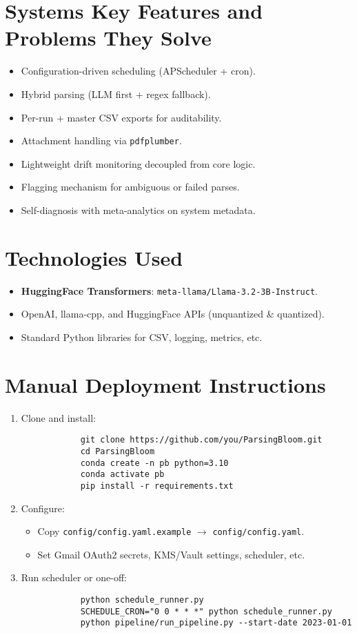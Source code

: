\documentclass{article}
\begin{document}
	\section{Systems Key Features and Problems They Solve}
	\begin{itemize}
		\item Configuration-driven scheduling (APScheduler + cron).  
		\item Hybrid parsing (LLM first + regex fallback).  
		\item Per-run + master CSV exports for auditability.  
		\item Attachment handling via \texttt{pdfplumber}.  
		\item Lightweight drift monitoring decoupled from core logic.  
		\item Flagging mechanism for ambiguous or failed parses.  
		\item Self-diagnosis with meta-analytics on system metadata.  
	\end{itemize}
	
	\section{Technologies Used}
	\begin{itemize}
		\item \textbf{HuggingFace Transformers}: \texttt{meta-llama/Llama-3.2-3B-Instruct}.  
		\item OpenAI, llama-cpp, and HuggingFace APIs (unquantized & quantized).  
		\item Standard Python libraries for CSV, logging, metrics, etc.  
	\end{itemize}
	
	\section{Manual Deployment Instructions}
	\begin{enumerate}
		\item Clone and install:
		\begin{verbatim}
			git clone https://github.com/you/ParsingBloom.git
			cd ParsingBloom
			conda create -n pb python=3.10
			conda activate pb
			pip install -r requirements.txt
		\end{verbatim}
		\item Configure:
		\begin{itemize}
			\item Copy \texttt{config/config.yaml.example} $\to$ \texttt{config/config.yaml}.  
			\item Set Gmail OAuth2 secrets, KMS/Vault settings, scheduler, etc.  
		\end{itemize}
		\item Run scheduler or one-off:
		\begin{verbatim}
			python schedule_runner.py
			SCHEDULE_CRON="0 0 * * *" python schedule_runner.py
			python pipeline/run_pipeline.py --start-date 2023-01-01
		\end{verbatim}
	\end{enumerate}
	
\end{document}

